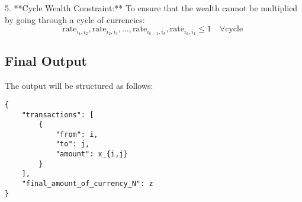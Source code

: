 \documentclass{article}
\begin{document}
5. **Cycle Wealth Constraint:**
   To ensure that the wealth cannot be multiplied by going through a cycle of currencies:
   \[
   \text{rate}_{i_1,i_2}, \text{rate}_{i_2,i_3}, \ldots, \text{rate}_{i_{k-1},i_k}, \text{rate}_{i_k,i_1} \leq 1 \quad \forall \text{cycle }
\]

\subsection*{Final Output}

The output will be structured as follows:

\begin{verbatim}
{
    "transactions": [
        {
            "from": i,
            "to": j,
            "amount": x_{i,j}
        }
    ],
    "final_amount_of_currency_N": z
}
\end{verbatim}
\end{document}
